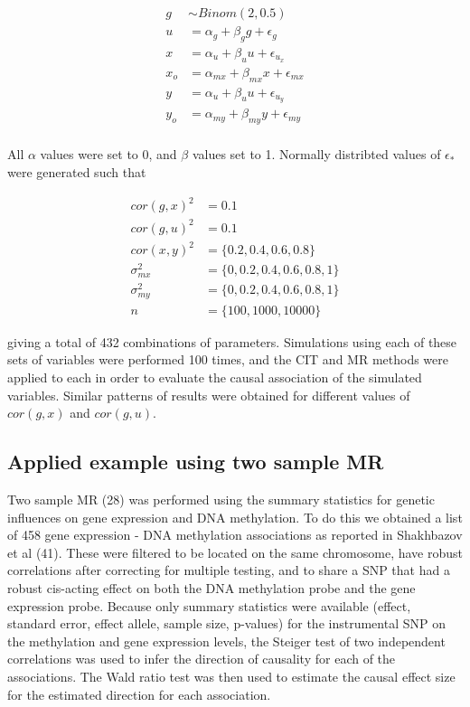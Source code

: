 \documentclass[]{article}
\begin{document}
\[
\begin{aligned}
g & \sim Binom(2, 0.5) \\
u & = \alpha_g + \beta_g g + \epsilon_g \\
x & = \alpha_u + \beta_u u + \epsilon_{u_x} \\
x_o & = \alpha_{mx} + \beta_{mx} x + \epsilon_{mx} \\
y & = \alpha_u + \beta_u u + \epsilon_{u_y} \\
y_o & = \alpha_{my} + \beta_{my} y + \epsilon_{my} \\
\end{aligned}
\]

All \(\alpha\) values were set to 0, and \(\beta\) values set to 1.
Normally distribted values of \(\epsilon_*\) were generated such that

\[
\begin{aligned}
cor(g, x)^2 & = 0.1 \\
cor(g, u)^2 & = 0.1 \\
cor(x, y)^2 & = \{0.2, 0.4, 0.6, 0.8\} \\
\sigma^2_{mx} & = \{0, 0.2, 0.4, 0.6, 0.8, 1\} \\
\sigma^2_{my} & = \{0, 0.2, 0.4, 0.6, 0.8, 1\} \\
n & = \{100, 1000, 10000\}
\end{aligned}
\]

giving a total of 432 combinations of parameters. Simulations using each
of these sets of variables were performed 100 times, and the CIT and MR
methods were applied to each in order to evaluate the causal association
of the simulated variables. Similar patterns of results were obtained
for different values of \(cor(g, x)\) and \(cor(g, u)\).

\subsection{Applied example using two sample
MR}\label{applied-example-using-two-sample-mr}

Two sample MR (28) was performed using the summary statistics for
genetic influences on gene expression and DNA methylation. To do this we
obtained a list of 458 gene expression - DNA methylation associations as
reported in Shakhbazov et al (41). These were filtered to be located on
the same chromosome, have robust correlations after correcting for
multiple testing, and to share a SNP that had a robust cis-acting effect
on both the DNA methylation probe and the gene expression probe. Because
only summary statistics were available (effect, standard error, effect
allele, sample size, p-values) for the instrumental SNP on the
methylation and gene expression levels, the Steiger test of two
independent correlations was used to infer the direction of causality
for each of the associations. The Wald ratio test was then used to
estimate the causal effect size for the estimated direction for each
association.
\end{document}

